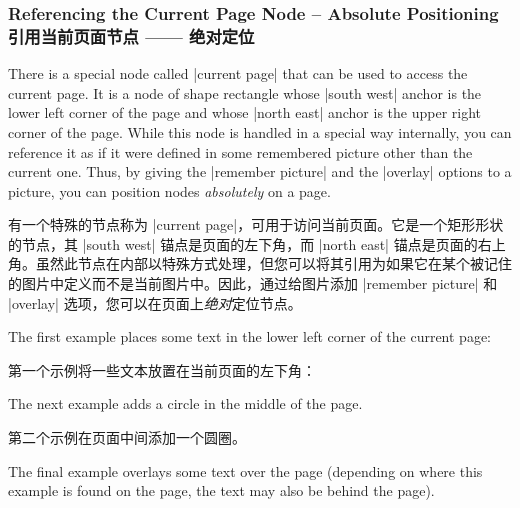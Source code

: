 \subsubsection{Referencing the Current Page Node -- Absolute Positioning\\引用当前页面节点 —— 绝对定位}

There is a special node called |current page| that can be used to access the
current page. It is a node of shape rectangle whose |south west| anchor is the
lower left corner of the page and whose |north east| anchor is the upper right
corner of the page. While this node is handled in a special way internally, you
can reference it as if it were defined in some remembered picture other than
the current one. Thus, by giving the |remember picture| and the |overlay|
options to a picture, you can position nodes \emph{absolutely} on a page.

有一个特殊的节点称为 |current page|，可用于访问当前页面。它是一个矩形形状的节点，其 |south west| 锚点是页面的左下角，而 |north east| 锚点是页面的右上角。虽然此节点在内部以特殊方式处理，但您可以将其引用为如果它在某个被记住的图片中定义而不是当前图片中。因此，通过给图片添加 |remember picture| 和 |overlay| 选项，您可以在页面上\emph{绝对}定位节点。


The first example places some text in the lower left corner of the current
page:

第一个示例将一些文本放置在当前页面的左下角：
%
\begin{codeexample}[]
\end{codeexample}

The next example adds a circle in the middle of the page.

第二个示例在页面中间添加一个圆圈。


\begin{codeexample}[]
\end{codeexample}

The final example overlays some text over the page (depending on where this
example is found on the page, the text may also be behind the page).

